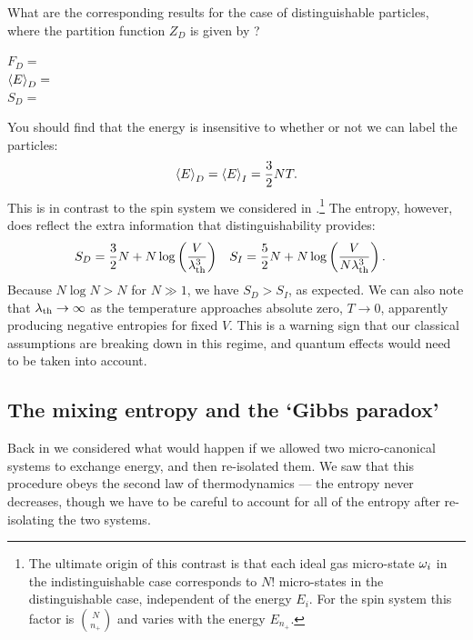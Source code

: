 \newpage %
What are the corresponding results for the case of distinguishable particles, where the partition function $Z_D$ is given by ?
\begin{mdframed}
  $\displaystyle F_D = $ \\[50 pt]
  $\displaystyle \left\langle E \right\rangle_D = $ \\[50 pt]
  $\displaystyle S_D = $ \\[50 pt]
\end{mdframed}
You should find that the energy is insensitive to whether or not we can label the particles:
\begin{equation}
  \label{eq:ideal_energy}
  \left\langle E \right\rangle_D = \left\langle E \right\rangle_I = \frac{3}{2} NT.
\end{equation}
This is in contrast to the spin system we considered in .\footnote{The ultimate origin of this contrast is that each ideal gas micro-state $\omega_i$ in the indistinguishable case corresponds to $N!$ micro-states in the distinguishable case, independent of the energy $E_i$.  For the spin system this factor is $\binom{N}{n_+}$ and varies with the energy $E_{n_+}$.}
The entropy, however, does reflect the extra information that distinguishability provides:
\begin{align}
  \label{eq:ideal_entropy}
  S_D & = \frac{3}{2} N + N \log\left(\frac{V}{\lambda_{\mathrm{th}}^3}\right) &
  S_I & = \frac{5}{2} N + N \log\left(\frac{V}{N\lambda_{\mathrm{th}}^3}\right).
\end{align}
Because $N\log N > N$ for $N \gg 1$, we have $S_D > S_I$, as expected.
We can also note that $\lambda_{\mathrm{th}} \to \infty$ as the temperature approaches absolute zero, $T \to 0$, apparently producing negative entropies for fixed $V$.
This is a warning sign that our classical assumptions are breaking down in this regime, and quantum effects would need to be taken into account.



\subsection{The mixing entropy and the `Gibbs paradox'}
Back in  we considered what would happen if we allowed two micro-canonical systems to exchange energy, and then re-isolated them.
We saw that this procedure obeys the second law of thermodynamics --- the entropy never decreases, though we have to be careful to account for all of the entropy after re-isolating the two systems.

